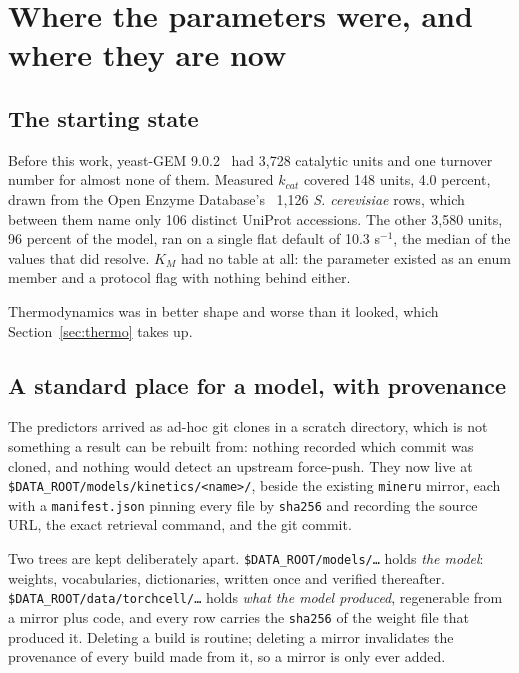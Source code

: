 
\section{Where the parameters were, and where they are now}
\label{sec:mirrors}

\subsection{The starting state}

Before this work, yeast-GEM 9.0.2~\cite{zhangYeast9ConsensusGenomescale2024} had 3{,}728
catalytic units and one turnover number for almost none of them. Measured $k_{cat}$ covered
148 units, 4.0 percent, drawn from the Open Enzyme
Database's~\cite{yuanOpenEnzymeDatabase2026} 1{,}126 \emph{S. cerevisiae} rows, which
between them name only 106 distinct UniProt accessions. The other 3{,}580 units, 96 percent of the model, ran on a
single flat default of 10.3 s$^{-1}$, the median of the values that did resolve. $K_M$ had
no table at all: the parameter existed as an enum member and a protocol flag with nothing
behind either.

Thermodynamics was in better shape and worse than it looked, which
Section~\ref{sec:thermo} takes up.

\subsection{A standard place for a model, with provenance}

The predictors arrived as ad-hoc git clones in a scratch directory, which is not something
a result can be rebuilt from: nothing recorded which commit was cloned, and nothing would
detect an upstream force-push. They now live at
\texttt{\$DATA\_ROOT/models/kinetics/<name>/}, beside the existing \texttt{mineru} mirror,
each with a \texttt{manifest.json} pinning every file by \texttt{sha256} and recording the
source URL, the exact retrieval command, and the git commit.

Two trees are kept deliberately apart. \texttt{\$DATA\_ROOT/models/\ldots} holds
\emph{the model}: weights, vocabularies, dictionaries, written once and verified
thereafter. \texttt{\$DATA\_ROOT/data/torchcell/\ldots} holds \emph{what the model
produced}, regenerable from a mirror plus code, and every row carries the
\texttt{sha256} of the weight file that produced it. Deleting a build is routine; deleting
a mirror invalidates the provenance of every build made from it, so a mirror is only ever
added.

